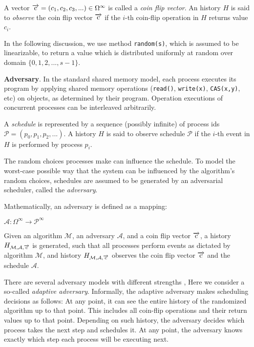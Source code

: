 A vector $\overrightarrow{\rm c} = (c_1, c_2, c_3, ...) \in \Omega^{\infty}$ is called a \emph{coin flip vector}. An history $H$ is
said to \emph{observe} the coin flip vector $\overrightarrow{\rm c}$ if
the $i$-th coin-flip operation in $H$
returns value $c_i$.

In the following discussion, we use method \texttt{random(s)}, which is assumed
to be linearizable, to return a value which is distributed uniformly at random over domain
$\{0, 1, 2,..., s-1\}$.

\textbf{Adversary}.
In the standard shared memory model, each process executes its program by applying
shared memory operations (\texttt{read()}, \texttt{write(x)}, \texttt{CAS(x,y)}, etc) on objects,
as determined by their program. Operation executions of concurrent processes
can be interleaved arbitrarily.

A \emph{schedule} is represented by a sequence (possibly infinite) of process ids $\mathcal{P} = (p_0, p_1, p_2,...)$.
A history $H$ is said to observe schedule $\mathcal{P}$ if the $i$-th event in $H$ is performed by process $p_i$.

The random choices processes make can influence the schedule. To model the worst-case possible
way that the system can be influenced by the algorithm’s random choices,
schedules are assumed to be generated by an adversarial scheduler,
called the \emph{adversary}.

Mathematically, an adversary is defined as a mapping:
\begin{center}
$\mathcal{A} :  \Omega^{\infty} \to \mathcal{P}^{\infty}$
\end{center}

Given an algorithm $\mathcal{M}$, an adversary $\mathcal{A}$, and a coin flip vector $\overrightarrow{\rm c}$,
a history $H_{\mathcal{M},\mathcal{A}, \overrightarrow{\rm c}}$ is generated, such that all
processes perform events as dictated by algorithm $\mathcal{M}$, and history
$H_{\mathcal{M}, \mathcal{A}, \overrightarrow{\rm c}}$
observes the coin flip vector $\overrightarrow{\rm c}$ and the schedule $\mathcal{A}$.

There are several adversary models with different strengths \cite{DBLP:journals/corr/cs-DS-0209014},
Here we consider a so-called \emph{adaptive adversary}. Informally, the adaptive adversary makes scheduling
decisions as follows: At any point, it can see the entire history of the randomized algorithm up to that point.
This includes all coin-flip operations and their return values up to that point. Depending on such
history, the adversary decides which process takes the next step and schedules it. At any point, the
adversary knows exactly which step each process will be executing next.

